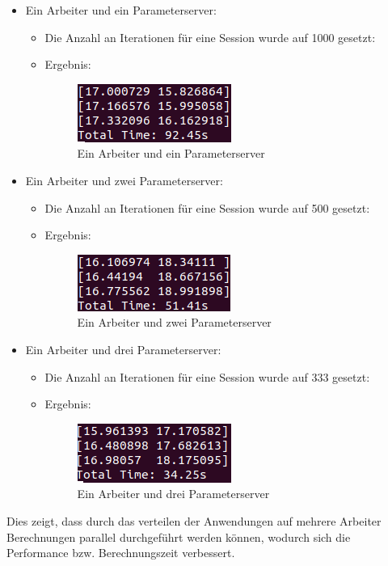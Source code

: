 \begin{itemize}
	\item Ein Arbeiter und ein Parameterserver:
	\begin{itemize}
		\item Die Anzahl an Iterationen für eine Session wurde auf 1000 gesetzt:
		\item Ergebnis:
		\vspace{-2mm}
			\begin{figure}[!h]
				\centering
				\includegraphics[width=0.5\linewidth]{Pictures/1worker1ps}
				\caption{Ein Arbeiter und ein Parameterserver}
				\label{fig:1worker1ps}
			\end{figure}
		\vspace{-5mm}
	\end{itemize}
	\item Ein Arbeiter und zwei Parameterserver:
	\begin{itemize}
		\item Die Anzahl an Iterationen für eine Session wurde auf 500 gesetzt:
		\item Ergebnis:
		\vspace{-2mm}
			\begin{figure}[!h]
				\centering
				\includegraphics[width=0.5\linewidth]{Pictures/2worker1ps}
				\caption{Ein Arbeiter und zwei Parameterserver}
				\label{fig:2worker1ps}
			\end{figure}
		\vspace{-5mm}
	\end{itemize}
	\item Ein Arbeiter und drei Parameterserver:
	\begin{itemize}
		\item Die Anzahl an Iterationen für eine Session wurde auf 333 gesetzt:
		\item Ergebnis:
		\vspace{-2mm}
			\begin{figure}[!h]
				\centering
				\includegraphics[width=0.5\linewidth]{Pictures/3worker1ps}
				\caption{Ein Arbeiter und drei Parameterserver}
				\label{fig:3worker1ps}
			\end{figure}	
		\vspace{-5mm}		
	\end{itemize}
\end{itemize}

Dies zeigt, dass durch das verteilen der Anwendungen auf mehrere Arbeiter Berechnungen parallel durchgeführt werden können, wodurch sich die Performance bzw. Berechnungszeit verbessert.